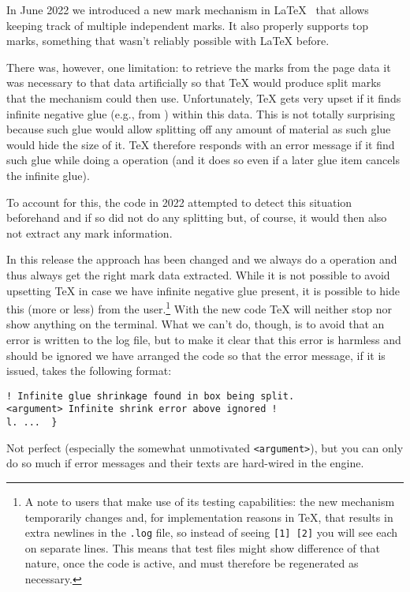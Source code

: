 \documentclass{ltnews}
\begin{document}
In June 2022 we introduced a new mark mechanism in
\LaTeX{}~\cite[p.~76]{39:ltnews} that allows keeping track of multiple
independent marks. It also  properly supports top marks, something that wasn't
reliably possible with \LaTeX{} before.

There was, however, one limitation: to retrieve the marks from the
page data it was necessary to  that data artificially so
that \TeX{} would produce split marks that the mechanism could then
use. Unfortunately, \TeX{} gets very upset if it finds infinite
negative glue (e.g., from ) within this data. This is not
totally surprising because such glue would allow splitting off any
amount of material as such glue would hide the size of it. \TeX{}
therefore responds with an error message if it find such glue while
doing a  operation (and it does so even if a later glue
item cancels the infinite glue).

To account for this, the code in 2022 attempted to detect this
situation beforehand and if so did not do any splitting but, of
course, it would then also not extract any mark information.

In this release the approach has been changed and we always do a
 operation and thus always get the right mark data
extracted. While it is not possible to avoid upsetting \TeX{} in case
we have infinite negative glue present, it is possible to hide this
(more or less) from the user.\footnote{A note to  users
that make use of its testing capabilities: the new mechanism
temporarily changes  and, for implementation
reasons in \TeX{}, that results in extra newlines in the \texttt{.log}
file, so instead of seeing \texttt{[1] [2]} you will see each on
separate lines. This means that test files might show difference of
that nature, once the code is active, and must therefore be
regenerated as necessary.}  With the new code \TeX{} will neither stop
nor show anything on the terminal. What we can't do, though, is to
avoid that an error is written to the log file, but to make it clear
that this error is harmless and should be ignored we have arranged the
code so that the error message, if it is issued, takes the following
format:
\begin{verbatim}
! Infinite glue shrinkage found in box being split.
<argument> Infinite shrink error above ignored ! 
l. ...  }
\end{verbatim}
Not perfect (especially the somewhat unmotivated \texttt{<argument>}),
but you can only do so much if error messages and their texts are
hard-wired in the engine.
\end{document}
